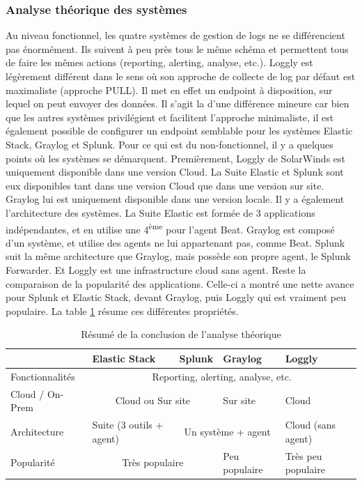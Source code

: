 \documentclass[paper=a4, fontsize=11pt]{scrartcl}
\newcommand{\ts}{\textsuperscript} %
\begin{document}
\subsubsection{Analyse théorique des systèmes}
Au niveau fonctionnel, les quatre systèmes de gestion de logs ne se différencient pas énormément. Ils suivent à peu près tous le même schéma et permettent tous de faire les mêmes actions (reporting, alerting, analyse, etc.). Loggly est légèrement différent dans le sens où son approche de collecte de log par défaut est maximaliste (approche PULL). Il met en effet un endpoint à disposition, sur lequel on peut envoyer des données. Il s'agit la d'une différence mineure car bien que les autres systèmes privilégient et facilitent l'approche minimaliste, il est également possible de configurer un endpoint semblable pour les systèmes Elastic Stack, Graylog et Splunk. \newline
Pour ce qui est du non-fonctionnel, il y a quelques points où les systèmes se démarquent. Premièrement, Loggly de SolarWinds est uniquement disponible dans une version Cloud. La Suite Elastic et Splunk sont eux disponibles tant dans une version Cloud que dans une version sur site. Graylog lui est uniquement disponible dans une version locale. Il y a également l'architecture des systèmes. La Suite Elastic est formée de 3 applications indépendantes, et en utilise une 4\ts{ème} pour l'agent Beat. Graylog est composé d'un système, et utilise des agents ne lui appartenant pas, comme Beat. Splunk suit la même architecture que Graylog, mais possède son propre agent, le Splunk Forwarder. Et Loggly est une infrastructure cloud sans agent. \newline
Reste la comparaison de la popularité des applications. Celle-ci a montré une nette avance pour Splunk et Elastic Stack, devant Graylog, puis Loggly qui est vraiment peu populaire. \newline
La table \ref{t-resumeAnalyseTheorique} résume ces différentes propriétés.

\begin{table}[H]
\centering
\begin{tabular}{ |m{2.9cm}|m{4cm}|m{2.9cm}|m{2.9cm}|m{3.2cm}|  }
    \hline
     & \textbf{Elastic Stack} & \textbf{Splunk} & \textbf{Graylog} & \textbf{Loggly} \\
    \hline
    Fonctionnalités & \multicolumn{4}{c|}{Reporting, alerting, analyse, etc.}\\
    \hline
    Cloud / On-Prem & \multicolumn{2}{c|}{Cloud ou Sur site} & Sur site & Cloud \\
    \hline
    Architecture  & Suite (3 outils + agent) & \multicolumn{2}{c|}{Un système + agent} & Cloud (sans agent) \\ 
    \hline
    Popularité & \multicolumn{2}{c|}{Très populaire} & Peu populaire & Très peu populaire \\
    \hline
\end{tabular}
\caption{Résumé de la conclusion de l'analyse théorique}
\label{t-resumeAnalyseTheorique}
\end{table}
\end{document}

